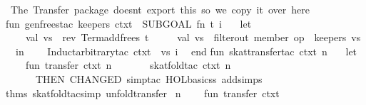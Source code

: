 \begin{isabellebody}
\isanewline
{}{}\ The\ Transfer\ package\ doesn{}t\ export\ this{}\ so\ we\ copy\ it\ over\ here\ {}{}\isanewline
fun\ gen{}frees{}tac\ keepers\ ctxt\ {}\ SUBGOAL\ {}fn\ {}t{}\ i{}\ {}{}\isanewline
\ \ let\isanewline
\ \ \ \ val\ vs\ {}\ rev\ {}Term{}add{}frees\ t\ {}{}{}\isanewline
\ \ \ \ val\ vs{}\ {}\ filter{}out\ {}member\ {}op\ {}{}\ keepers{}\ vs\isanewline
\ \ in\isanewline
\ \ \ \ Induct{}arbitrary{}tac\ ctxt\ {}\ vs{}\ i\isanewline
\ \ end{}\isanewline
\isanewline
fun\ skat{}transfer{}tac\ ctxt\ n\ {}\isanewline
\ \ let\isanewline
\ \ \ \ fun\ transfer{}\ ctxt\ n\ {}\isanewline
\ \ \ \ \ \ skat{}fold{}tac\ ctxt\ n\isanewline
\ \ \ \ \ \ THEN\ CHANGED\ {}simp{}tac\ {}HOL{}basic{}ss\ addsimps\ %
\isaantiq
thms\ skat{}fold{}tac{}simp\ unfold{}transfer{}%
\endisaantiq
{}\ n{}\isanewline
\ \ \ \ fun\ transfer{}\ ctxt\ {}\isanewline

\end{isabellebody}
